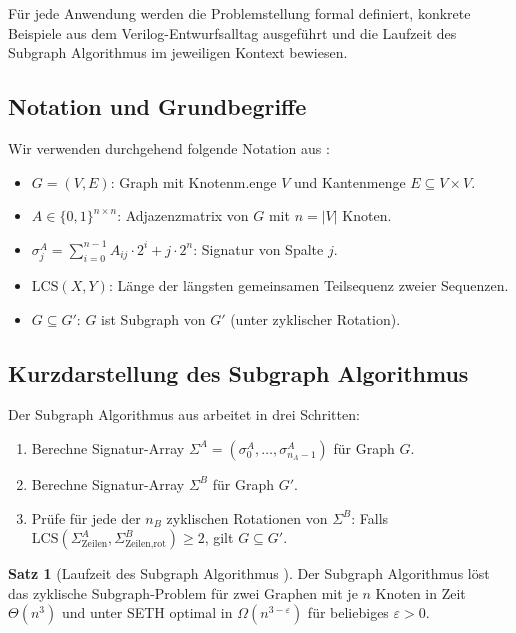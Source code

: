 ﻿\documentclass[a4paper,12pt]{article}
\theoremstyle{definition}
\newtheorem{satz}{Satz}
\begin{document}
Für jede Anwendung werden die Problemstellung formal definiert, konkrete Beispiele
aus dem Verilog-Entwurfsalltag ausgeführt und die Laufzeit des Subgraph Algorithmus im
jeweiligen Kontext bewiesen.

\subsection{Notation und Grundbegriffe}

Wir verwenden durchgehend folgende Notation aus \cite{subgraph2026}:

\begin{itemize}
  \item $G = (V, E)$: Graph mit Knotenm.\:enge $V$ und Kantenmenge $E \subseteq V \times V$.
  \item $A \in \{0,1\}^{n \times n}$: Adjazenzmatrix von $G$ mit $n = |V|$ Knoten.
  \item $\sigma_j^A = \sum_{i=0}^{n-1} A_{ij} \cdot 2^i + j \cdot 2^n$: Signatur von Spalte $j$.
  \item $\text{LCS}(X, Y)$: Länge der längsten gemeinsamen Teilsequenz zweier Sequenzen.
  \item $G \subseteq G'$: $G$ ist Subgraph von $G'$ (unter zyklischer Rotation).
\end{itemize}

\subsection{Kurzdarstellung des Subgraph Algorithmus}

Der Subgraph Algorithmus aus \cite{subgraph2026} arbeitet in drei Schritten:

\begin{enumerate}
  \item Berechne Signatur-Array $\Sigma^A = (\sigma_0^A, \ldots, \sigma_{n_A-1}^A)$ für Graph $G$.
  \item Berechne Signatur-Array $\Sigma^B$ für Graph $G'$.
  \item Prüfe für jede der $n_B$ zyklischen Rotationen von $\Sigma^B$: Falls
        $\text{LCS}(\Sigma^A_{\text{Zeilen}}, \Sigma^B_{\text{Zeilen,rot}}) \geq 2$, gilt $G \subseteq G'$.
\end{enumerate}

\begin{satz}[Laufzeit des Subgraph Algorithmus {\cite{subgraph2026}}]\label{satz:basis}
  Der Subgraph Algorithmus löst das zyklische Subgraph-Problem für zwei Graphen mit je $n$
  Knoten in Zeit $\Theta(n^3)$ und unter SETH optimal in $\Omega(n^{3-\varepsilon})$ für
  beliebiges $\varepsilon > 0$.
\end{satz}
\end{document}
